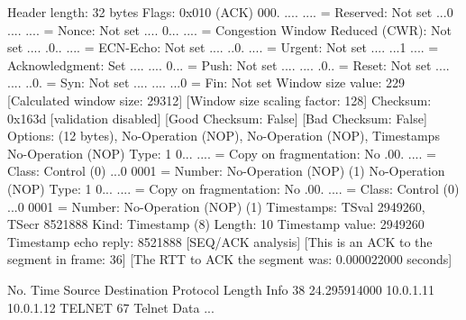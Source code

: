     Header length: 32 bytes
    Flags: 0x010 (ACK)
        000. .... .... = Reserved: Not set
        ...0 .... .... = Nonce: Not set
        .... 0... .... = Congestion Window Reduced (CWR): Not set
        .... .0.. .... = ECN-Echo: Not set
        .... ..0. .... = Urgent: Not set
        .... ...1 .... = Acknowledgment: Set
        .... .... 0... = Push: Not set
        .... .... .0.. = Reset: Not set
        .... .... ..0. = Syn: Not set
        .... .... ...0 = Fin: Not set
    Window size value: 229
    [Calculated window size: 29312]
    [Window size scaling factor: 128]
    Checksum: 0x163d [validation disabled]
        [Good Checksum: False]
        [Bad Checksum: False]
    Options: (12 bytes), No-Operation (NOP), No-Operation (NOP), Timestamps
        No-Operation (NOP)
            Type: 1
                0... .... = Copy on fragmentation: No
                .00. .... = Class: Control (0)
                ...0 0001 = Number: No-Operation (NOP) (1)
        No-Operation (NOP)
            Type: 1
                0... .... = Copy on fragmentation: No
                .00. .... = Class: Control (0)
                ...0 0001 = Number: No-Operation (NOP) (1)
        Timestamps: TSval 2949260, TSecr 8521888
            Kind: Timestamp (8)
            Length: 10
            Timestamp value: 2949260
            Timestamp echo reply: 8521888
    [SEQ/ACK analysis]
        [This is an ACK to the segment in frame: 36]
        [The RTT to ACK the segment was: 0.000022000 seconds]

No.     Time           Source                Destination           Protocol Length Info
     38 24.295914000   10.0.1.11             10.0.1.12             TELNET   67     Telnet Data ...

